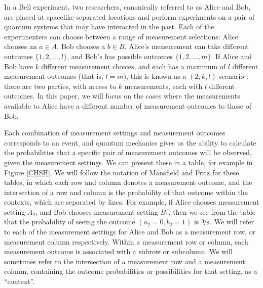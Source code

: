 \documentclass[reprint]{revtex4-1}
\theoremstyle{definition}
\begin{document}
In a Bell experiment, two researchers, canonically referred to as Alice and Bob, are placed at spacelike separated locations and perform experiments on a pair of quantum systems that may have interacted in the past. Each of the experimenters can choose between a range of measurement selections: Alice chooses an $a\in A$, Bob chooses a $b\in B$. Alice's measurement can take different outcomes $\{1,2,\dots,l\}$, and Bob's has possible outcomes $\{1,2,\dots,m\}$. If Alice and Bob have $k$ different measurement choices, and each has a maximum of $l$ different measurement outcomes (that is, $l=m$), this is known as a $(2,k,l)$ scenario \cite{Mans2011,Abra2013}: there are two parties, with access to $k$ measurements, each with $l$ different outcomes. In this paper, we will focus on the cases where the measurements available to Alice have a different number of measurement outcomes to those of Bob.

Each combination of measurement settings and measurement outcomes corresponds to an event, and quantum mechanics gives us the ability to calculate the probabilities that a specific pair of measurement outcomes will be observed, given the measurement settings. We can present these in a table, for example in Figure \ref{CHSH}. We will follow the notation of Mansfield and Fritz for these tables, in which each row and column denotes a measurement outcome, and the intersection of a row and column is the probability of that outcome within the contexts, which are separated by lines.  For example, if Alice chooses measurement setting $A_2$, and Bob chooses measurement setting $B_1$, then we see from the table that the probability of seeing the outcome $(a_2=0, b_2=1)$ is $\nicefrac38$. We will refer to each of the measurement settings for Alice and Bob as a measurement row, or measurement column respectively. Within a measurement row or column, each measurement outcome is associated with a subrow or subcolumn. We will sometimes refer to the intersection of a measurement row and a measurement column, containing the outcome probabilities or possibilities for that setting, as a ``context''.
\end{document}
